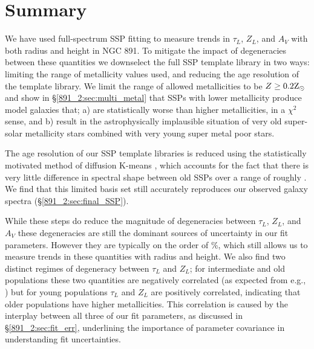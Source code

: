 \section{Summary}
\label{891_2:sec:summary}

We have used full-spectrum SSP fitting to measure trends in $\tau_L$,
$Z_L$, and $A_V$ with both radius and height in NGC 891. To mitigate
the impact of degeneracies between these quantities we downselect the
full  SSP template library in two ways: limiting
the range of metallicity values used, and reducing the age resolution
of the template library. We limit the range of allowed metallicities
to be $Z \geq 0.2\mathrm{Z}_{\odot}$ and show in \S\ref{891_2:sec:multi_metal} that
SSPs with lower metallicity produce model galaxies that; a) are
statistically worse than higher metallicities, in a $\chi^2$ sense,
and b) result in the astrophysically implausible situation of very old
super-solar metallicity stars combined with very young super metal
poor stars.

The age resolution of our SSP template libraries is reduced using the
statistically motivated method of diffusion K-means
, which accounts for the fact that there is very
little difference in spectral shape between old SSPs over a range of
roughly . We find that this limited basis set still
accurately reproduces our observed galaxy spectra
(\S\ref{891_2:sec:final_SSP}).

While these steps do reduce the magnitude of degeneracies between
$\tau_L$, $Z_L$, and $A_V$ these degeneracies are still the dominant
sources of uncertainty in our fit parameters. However they are
typically on the order of \%, which still allows us to measure
trends in these quantities with radius and height. We also find two
distinct regimes of degeneracy between $\tau_L$ and $Z_L$; for
intermediate and old populations these two quantities are negatively
correlated (as expected from e.g.,
\citet{Oconnel76,Aaronson78,Worthey94,dePaz02}) but for young
populations $\tau_L$ and $Z_L$ are positively correlated, indicating
that older populations have higher metallicities. This correlation is
caused by the interplay between all three of our fit parameters, as
discussed in \S\ref{891_2:sec:fit_err}, underlining the importance of
parameter covariance in understanding fit uncertainties.


